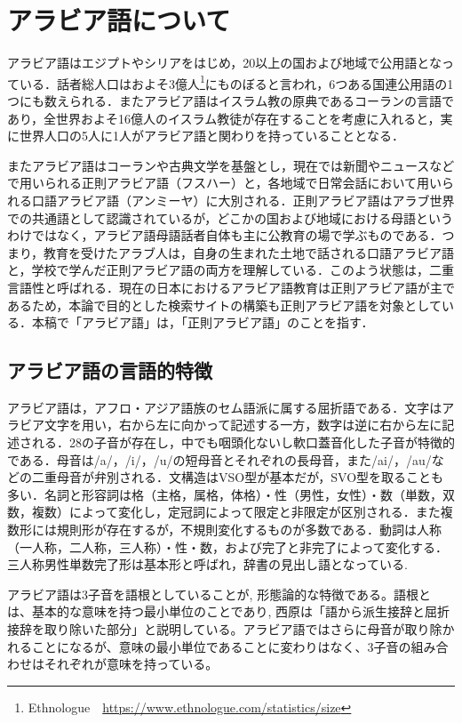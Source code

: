 \documentclass[technicalreport]{ieicej}
\begin{document}
\section{アラビア語について}
アラビア語はエジプトやシリアをはじめ，20以上の国および地域で公用語となっている．話者総人口はおよそ3億人\footnote{Ethnologue　\url{https://www.ethnologue.com/statistics/size}}にものぼると言われ，6つある国連公用語の1つにも数えられる．またアラビア語はイスラム教の原典であるコーランの言語であり，全世界およそ16億人のイスラム教徒が存在することを考慮に入れると，実に世界人口の5人に1人がアラビア語と関わりを持っていることとなる．

またアラビア語はコーランや古典文学を基盤とし，現在では新聞やニュースなどで用いられる正則アラビア語（フスハー）と，各地域で日常会話において用いられる口語アラビア語（アンミーヤ）に大別される．正則アラビア語はアラブ世界での共通語として認識されているが，どこかの国および地域における母語というわけではなく，アラビア語母語話者自体も主に公教育の場で学ぶものである．つまり，教育を受けたアラブ人は，自身の生まれた土地で話される口語アラビア語と，学校で学んだ正則アラビア語の両方を理解している．このよう状態は，二重言語性と呼ばれる．現在の日本におけるアラビア語教育は正則アラビア語が主であるため，本論で目的とした検索サイトの構築も正則アラビア語を対象としている．本稿で「アラビア語」は，「正則アラビア語」のことを指す．

\subsection{アラビア語の言語的特徴}
アラビア語は，アフロ・アジア語族のセム語派に属する屈折語である．文字はアラビア文字を用い，右から左に向かって記述する一方，数字は逆に右から左に記述される．28の子音が存在し，中でも咽頭化ないし軟口蓋音化した子音が特徴的である．母音は/a/，/i/，/u/の短母音とそれぞれの長母音，また/ai/，/au/などの二重母音が弁別される．文構造はVSO型が基本だが，SVO型を取ることも多い．名詞と形容詞は格（主格，属格，体格）・性（男性，女性）・数（単数，双数，複数）によって変化し，定冠詞によって限定と非限定が区別される．また複数形には規則形が存在するが，不規則変化するものが多数である．動詞は人称（一人称，二人称，三人称）・性・数，および完了と非完了によって変化する．三人称男性単数完了形は基本形と呼ばれ，辞書の見出し語となっている.

アラビア語は3子音を語根としていることが, 形態論的な特徴である。語根とは、基本的な意味を持つ最小単位のことであり, 西原は「語から派生接辞と屈折接辞を取り除いた部分」と説明している。アラビア語ではさらに母音が取り除かれることになるが、意味の最小単位であることに変わりはなく、3子音の組み合わせはそれぞれが意味を持っている。
\end{document}
